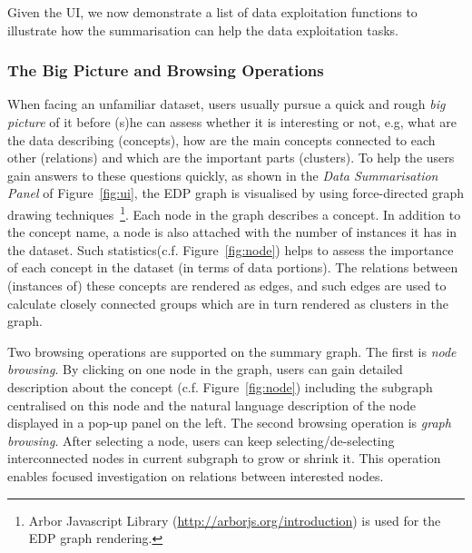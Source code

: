 Given the UI, we now demonstrate a list of data exploitation functions to illustrate how the summarisation can help the data exploitation tasks.

\vspace{-4ex}
\subsubsection{The Big Picture and Browsing Operations}
When facing an unfamiliar dataset, users usually pursue a quick and rough \emph{big picture} of it before (s)he can assess whether it is interesting or not, e.g, what are the data describing (concepts), how are the main concepts connected to each other (relations) and which are the important parts (clusters). To help the users gain answers to these questions quickly, as shown in the \emph{Data Summarisation Panel} of Figure~\ref{fig:ui}, the EDP graph is visualised by using force-directed graph drawing techniques~\footnote{Arbor Javascript Library (\url{http://arborjs.org/introduction}) is used for the EDP graph rendering.}. Each node in the graph describes a concept. In addition to the concept name, a node is also attached with the number of instances it has in the dataset. Such statistics(c.f. Figure~\ref{fig:node}) helps to assess the importance of each concept in the dataset (in terms of data portions). The relations between (instances of) these concepts are rendered as edges, and such edges are used to calculate closely connected groups which are in turn rendered as clusters in the graph.

Two browsing operations are supported on the summary graph. The first is \emph{node browsing}. By clicking on one node in the graph, users can gain detailed description about the concept (c.f. Figure~\ref{fig:node}) including the subgraph centralised on this node and the natural language description of the node displayed in a pop-up panel on the left. The second browsing operation is \emph{graph browsing}. After selecting a node, users can keep selecting/de-selecting interconnected nodes in current subgraph to grow or shrink it. This operation enables focused investigation on relations between interested nodes.
\vspace{-4ex}
